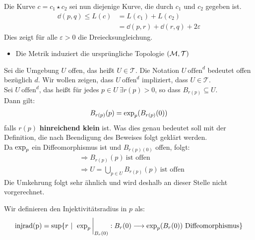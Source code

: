 \begin{bew}
Die Kurve $c = c_1 \star c_2$ sei nun diejenige Kurve, die durch $c_1$ und $c_2$ gegeben ist.
\begin{align*}
\dd(p, q) \leq L(c) &= L(c_1) + L(c_2) \\
&= \dd(p, r) + \dd(r, q) +2\varepsilon
\end{align*}
Dies zeigt für alle $\varepsilon>0$ die Dreiecksungleichung.
\begin{itemize}
\item Die Metrik induziert die ursprüngliche Topologie $(\mathcal{M}, \mathcal{T})$
\end{itemize}
Sei die Umgebung $U$ offen, das heißt $U \in \mathcal{T}$. Die Notation $U \ \text{offen}^d$ bedeutet offen bezüglich $d$. Wir wollen zeigen, dass $U \ \text{offen}^d$ impliziert, dass $U \in \mathcal{T}$. \\
Sei $U \ \text{offen}^d$, das heißt für jedes $p \in U \  \exists r(p)>0$, so dass $B_{r(p)} \subseteq U$. \\
Dann gilt:
\begin{align*}
B_{r(p)}(p)= \operatorname{exp}_p(B_{r(p)}(0))
\end{align*}
falls $r(p)$ \textbf{hinreichend klein} ist. Was dies genau bedeutet soll mit der Definition, die nach Beendigung des Beweises folgt geklärt werden. \\
Da $\operatorname{exp}_p$ ein Diffeomorphismus ist und $B_{r(p)(0)}$ offen, folgt:
\begin{align*}
&\Rightarrow B_{r(p)}(p) \ \text{ist offen} \\
&\Rightarrow U = \bigcup_{p \in U} B_{r(p)}(p) \ \text{ist offen}
\end{align*}
Die Umkehrung folgt sehr ähnlich und wird deshalb an dieser Stelle nicht vorgerechnet.
\end{bew} 
\begin{defs}[Injektivitätsradius]
Wir definieren den Injektivitätsradius in $p$ als: 
\begin{align}
\operatorname{injrad(p)} = \sup\{ r \ | \ \eval{\expp_p}_{B_r(0)}: B_r(0) \longrightarrow \expp_p(B_r(0)) \ \text{Diffeomorphismus}\}
\end{align}
\end{defs}
